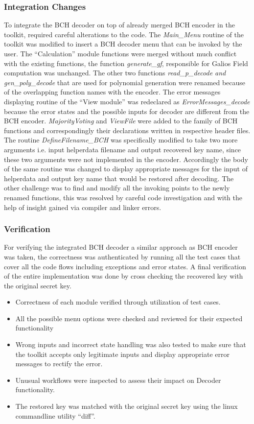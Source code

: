 	\subsubsection{Integration Changes}
	To integrate the BCH decoder on top of already merged BCH encoder in the toolkit, required careful alterations to the code. The \emph{Main\_Menu} routine of the toolkit was modified to insert a BCH decoder menu that can be invoked by the user. The ``Calculation'' module functions were merged without much conflict with the existing functions, the function \emph{generate\_gf}, responsible for Galios Field computation was unchanged. The other two functions
	\emph{read\_p\_decode and gen\_poly\_decode} that are used for polynomial generation were renamed because of the overlapping function names with the encoder. The error messages displaying routine of the ``View module'' was redeclared as  \emph{ErrorMessages\_decode} because the error states and the possible inputs for decoder are different from the BCH encoder. \emph{MajorityVoting} and \emph{ViewFile} were added to the family of BCH functions and correspondingly their declarations written in respective header files. The
	routine \emph{DefineFilename\_BCH} was specifically modified to take two more arguments i.e. input helperdata filename and output recovered key name, since these two arguments were not implemented in the encoder. Accordingly the body of the same routine was changed to display appropriate messages for the input of helperdata and output key name that would be restored after decoding. The other challenge was to find and modify all the invoking points to the newly renamed functions, this was
	resolved by careful code investigation and with the help of insight gained via compiler and linker errors.\\

	\subsubsection{Verification}
	For verifying the integrated BCH decoder a similar approach as BCH encoder was taken, the correctness was authenticated by running all the test cases that cover all the code flows including exceptions and error states. A final verification of the entire implementation was done by cross checking the recovered key with the original secret key.


	\begin{itemize}
		\item Correctness of each module verified through utilization of test cases.
		\item All the possible menu options were checked and reviewed for their expected functionality
		\item Wrong inputs and incorrect state handling was also tested to make sure that the toolkit accepts only legitimate inputs and display appropriate error messages to rectify the error.
		\item Unusual workflows were inspected to assess their impact on Decoder functionality.
		\item The restored key was matched with the original secret key using the linux commandline utility ``diff''.
	\end{itemize}

